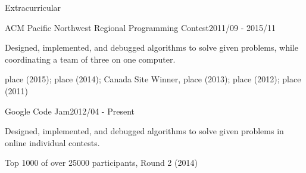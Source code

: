 \documentclass{resume} %
\begin{document}
\begin{rSection}{Extracurricular}

\begin{rSubsection}{ACM Pacific Northwest Regional Programming Contest}{2011/09 - 2015/11}{}{}
\item Designed, implemented, and debugged algorithms to solve given problems, while coordinating a team of three on one computer.
\item {} place (2015);  place (2014); Canada Site Winner,  place (2013);  place (2012);  place (2011)
\end{rSubsection}

\begin{rSubsection}{Google Code Jam}{2012/04 - Present}{}{}
\item Designed, implemented, and debugged algorithms to solve given problems in online individual contests.
\item Top 1000 of over 25000 participants, Round 2 (2014)
\end{rSubsection}





\end{rSection}








\end{document}
